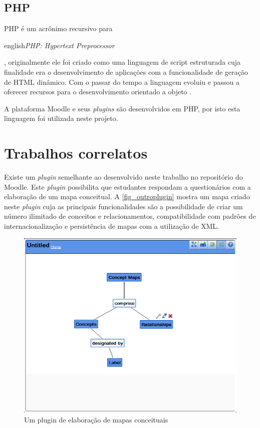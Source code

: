 \documentclass[
	12pt,				%
	openright,			%
	oneside,			%
	a4paper,			%
	english,			%
	french,				%
	spanish,			%
	brazil				%
	]{abntex2}
\begin{document}
\subsection{PHP}
PHP é um acrônimo recursivo para \begin{otherlanguage*}{english}\textit{PHP: Hypertext Preprocessor}\end{otherlanguage*}, originalmente ele foi criado como uma linguagem de script estruturada cuja finalidade era o desenvolvimento de aplicações com a funcionalidade de geração de HTML dinâmico. Com o passar do tempo a linguagem evoluiu e passou a oferecer recursos para o desenvolvimento orientado a objeto \cite{minetto2007}.

A plataforma Moodle e seus \textit{plugins} são desenvolvidos em PHP, por isto esta linguagem foi utilizada neste projeto. 

\section{Trabalhos correlatos}

Existe um \textit{plugin} semelhante ao desenvolvido neste trabalho no repositório do Moodle. Este \textit{plugin} possibilita que estudantes respondam a questionários com a elaboração de um mapa conceitual. A \autoref{fig_outroplugin} mostra um mapa criado neste \textit{plugin} cuja as principais funcionalidades são a possibilidade de criar um número ilimitado de conceitos e relacionamentos, compatibilidade com padrões de internacionalização e persistência de mapas com a utilização de XML. 

\begin{figure}[htb]
	\caption{\label{fig_outroplugin} Um plugin de elaboração de mapas conceituais}
	\begin{center}
		\includegraphics[scale=0.4]{outroplugin.png}
	\end{center}
\end{figure} 
\end{document}
